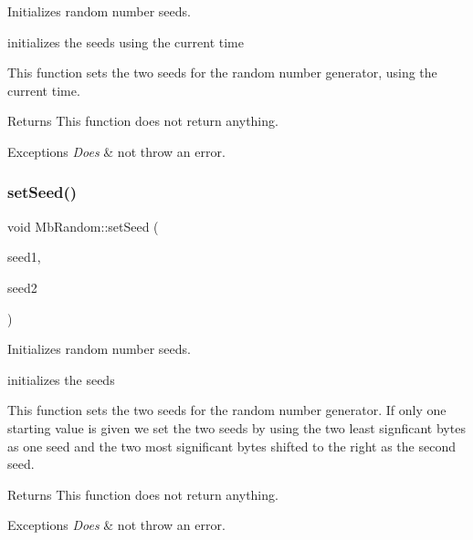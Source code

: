 Initializes random number seeds. 

initializes the seeds using the current time

This function sets the two seeds for the random number generator, using the current time.

\begin{DoxyReturn}{Returns}
This function does not return anything. 
\end{DoxyReturn}

\begin{DoxyExceptions}{Exceptions}
{\em Does} & not throw an error. \\
\hline
\end{DoxyExceptions}
\mbox{\label{class_mb_random_a737fb472831030eaa72d86e93a47d365}} 
\subsubsection{\texorpdfstring{setSeed()}{setSeed()}\hspace{0.1cm}{\footnotesize\ttfamily [2/2]}}
{\footnotesize\ttfamily void Mb\+Random\+::set\+Seed (\begin{DoxyParamCaption}\item[{\mbox{\hyperlink{_mb_random_8h_a4aa644a391dc423f6cb86710cc056d8b}{seed\+Type}}}]{seed1,  }\item[{\mbox{\hyperlink{_mb_random_8h_a4aa644a391dc423f6cb86710cc056d8b}{seed\+Type}}}]{seed2 }\end{DoxyParamCaption})}



Initializes random number seeds. 

initializes the seeds

This function sets the two seeds for the random number generator. If only one starting value is given we set the two seeds by using the two least signficant bytes as one seed and the two most significant bytes shifted to the right as the second seed.

\begin{DoxyReturn}{Returns}
This function does not return anything. 
\end{DoxyReturn}

\begin{DoxyExceptions}{Exceptions}
{\em Does} & not throw an error. \\
\hline
\end{DoxyExceptions}
\mbox{\label{class_mb_random_aa975313092805421e835bfa934512111}} 
